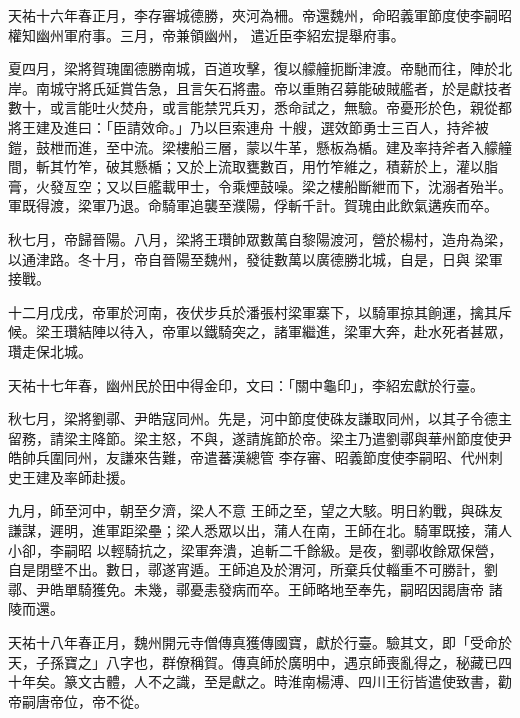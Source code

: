 
\begin{pinyinscope}

 天祐十六年春正月，李存審城德勝，夾河為柵。帝還魏州，命昭義軍節度使李嗣昭權知幽州軍府事。三月，帝兼領幽州，
 遣近臣李紹宏提舉府事。



 夏四月，梁將賀瑰圍德勝南城，百道攻擊，復以艨艟扼斷津渡。帝馳而往，陣於北岸。南城守將氏延賞告急，且言矢石將盡。帝以重賄召募能破賊艦者，於是獻技者數十，或言能吐火焚舟，或言能禁咒兵刃，悉命試之，無驗。帝憂形於色，親從都將王建及進曰：「臣請效命。」乃以巨索連舟
 十艘，選效節勇士三百人，持斧被鎧，鼓枻而進，至中流。梁樓船三層，蒙以牛革，懸板為楯。建及率持斧者入艨艟間，斬其竹笮，破其懸楯；又於上流取甕數百，用竹笮維之，積薪於上，灌以脂膏，火發亙空；又以巨艦載甲士，令乘煙鼓噪。梁之樓船斷紲而下，沈溺者殆半。軍既得渡，梁軍乃退。命騎軍追襲至濮陽，俘斬千計。賀瑰由此飲氣遘疾而卒。



 秋七月，帝歸晉陽。八月，梁將王瓚帥眾數萬自黎陽渡河，營於楊村，造舟為梁，以通津路。冬十月，帝自晉陽至魏州，發徒數萬以廣德勝北城，自是，日與
 梁軍接戰。



 十二月戊戌，帝軍於河南，夜伏步兵於潘張村梁軍寨下，以騎軍掠其餉運，擒其斥候。梁王瓚結陣以待入，帝軍以鐵騎突之，諸軍繼進，梁軍大奔，赴水死者甚眾，瓚走保北城。



 天祐十七年春，幽州民於田中得金印，文曰：「關中龜印」，李紹宏獻於行臺。



 秋七月，梁將劉鄩、尹皓寇同州。先是，河中節度使硃友謙取同州，以其子令德主留務，請梁主降節。梁主怒，不與，遂請旄節於帝。梁主乃遣劉鄩與華州節度使尹皓帥兵圍同州，友謙來告難，帝遣蕃漢總管
 李存審、昭義節度使李嗣昭、代州刺史王建及率師赴援。



 九月，師至河中，朝至夕濟，梁人不意
 王師之至，望之大駭。明日約戰，與硃友謙謀，遲明，進軍距梁壘；梁人悉眾以出，蒲人在南，王師在北。騎軍既接，蒲人小卻，李嗣昭
 以輕騎抗之，梁軍奔潰，追斬二千餘級。是夜，劉鄩收餘眾保營，自是閉壁不出。數日，鄩遂宵遁。王師追及於渭河，所棄兵仗輜重不可勝計，劉鄩、尹皓單騎獲免。未幾，鄩憂恚發病而卒。王師略地至奉先，嗣昭因謁唐帝
 諸陵而還。



 天祐十八年春正月，魏州開元寺僧傳真獲傳國寶，獻於行臺。驗其文，即「受命於天，子孫寶之」八字也，群僚稱賀。傳真師於廣明中，遇京師喪亂得之，秘藏已四十年矣。篆文古體，人不之識，至是獻之。時淮南楊溥、四川王衍皆遣使致書，勸帝嗣唐帝位，帝不從。




\end{pinyinscope}
